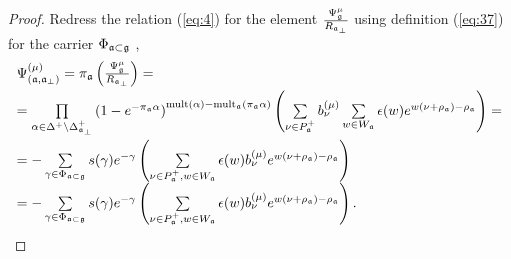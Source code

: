 \documentclass[12pt]{iopart}
\theoremstyle{definition}
\newcommand{\af}{\mathfrak{a}}
\newcommand{\afb}{\mathfrak{a}_{\bot}}
\begin{document}
\begin{proof}
Redress the relation (\ref{eq:4}) for the element $
\frac{\Psi _{\frak{g}}^{\mu }}{R_{\af_{\perp }}}$ using definition (\ref{eq:37})
for the carrier $\Phi _{\af\subset \frak{g}}$ ,
\begin{equation*}
\begin{array}{l}
\Psi ^{\left( \mu \right) }_{\left(  \af, \afb \right)}
=\pi _{\frak{a}}\left( \frac{\Psi _{\frak{g}}^{\mu }}{R_{\af_{\perp }}}%
\right) = \\[2mm]
=\prod\limits_{\alpha \in \Delta ^{+}\setminus \Delta _{\afb }^{+}}\left(
1-e^{-\pi _{\af}\alpha }\right) ^{\mathrm{mult}(\alpha )-\mathrm{mult}_{%
\af}(\pi _{\af}\alpha )}\left( \sum\limits_{\nu \in P_{\af%
}^{+}}b_{\nu }^{(\mu )}\sum\limits_{w\in W_{\af}}\epsilon (w)e^{w(\nu
+\rho _{\af})-\rho _{\af}}\right) = \\[5mm]
=-\sum\limits_{\gamma \in \Phi _{\af\subset \frak{g}}}s(\gamma
)e^{-\gamma }\left( \sum\limits_{\nu \in P_{\af}^{+},w\in W_{\af%
}}\epsilon (w)b_{\nu }^{(\mu )}e^{w(\nu +\rho _{\af})-\rho _{\af%
}}\right)  \\
=-\sum\limits_{\gamma \in \Phi _{\af\subset \frak{g}}}s(\gamma
)e^{-\gamma }\left( \sum\limits_{\nu \in P_{\af}^{+},w\in W_{\af%
}}\epsilon (w)b_{\nu }^{(\mu )}e^{w(\nu +\rho _{\af})-\rho _{\af%
}}\right) .
\end{array}
\end{equation*}


\end{proof}
\end{document}
